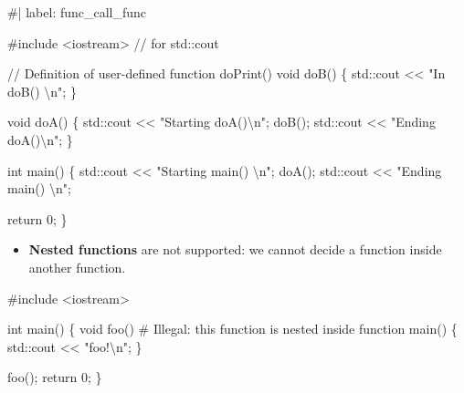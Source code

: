 \documentclass[
  letterpaper,
  DIV=11,
  numbers=noendperiod]{scrreprt}
\newenvironment{Shaded}{\begin{snugshade}}{\end{snugshade}}
\newcommand{\CommentTok}[1]{\textcolor[rgb]{0.37,0.37,0.37}{#1}}
\newcommand{\ControlFlowTok}[1]{\textcolor[rgb]{0.00,0.23,0.31}{#1}}
\newcommand{\DecValTok}[1]{\textcolor[rgb]{0.68,0.00,0.00}{#1}}
\newcommand{\ErrorTok}[1]{\textcolor[rgb]{0.68,0.00,0.00}{#1}}
\newcommand{\FunctionTok}[1]{\textcolor[rgb]{0.28,0.35,0.67}{#1}}
\newcommand{\NormalTok}[1]{\textcolor[rgb]{0.00,0.23,0.31}{#1}}
\newcommand{\SpecialCharTok}[1]{\textcolor[rgb]{0.37,0.37,0.37}{#1}}
\newcommand{\StringTok}[1]{\textcolor[rgb]{0.13,0.47,0.30}{#1}}
\providecommand{\tightlist}{%
  \setlength{\itemsep}{0pt}\setlength{\parskip}{0pt}}\usepackage{longtable,booktabs,array}
\begin{document}
\begin{Shaded}
\begin{Highlighting}[]
\CommentTok{\#| label: func\_call\_func}

\CommentTok{\#include \textless{}iostream\textgreater{}     // for std::cout}

\SpecialCharTok{/}\ErrorTok{/}\NormalTok{ Definition of user}\SpecialCharTok{{-}}\NormalTok{defined }\ControlFlowTok{function} \FunctionTok{doPrint}\NormalTok{()}
\NormalTok{void }\FunctionTok{doB}\NormalTok{()}
\NormalTok{\{}
\NormalTok{    std}\SpecialCharTok{::}\NormalTok{cout }\SpecialCharTok{\textless{}}\ErrorTok{\textless{}} \StringTok{"In doB() }\SpecialCharTok{\textbackslash{}n}\StringTok{"}\NormalTok{;}
\NormalTok{\}}

\NormalTok{void }\FunctionTok{doA}\NormalTok{()}
\NormalTok{\{}
\NormalTok{    std}\SpecialCharTok{::}\NormalTok{cout }\SpecialCharTok{\textless{}}\ErrorTok{\textless{}} \StringTok{"Starting doA()}\SpecialCharTok{\textbackslash{}n}\StringTok{"}\NormalTok{;}
    \FunctionTok{doB}\NormalTok{();}
\NormalTok{    std}\SpecialCharTok{::}\NormalTok{cout }\SpecialCharTok{\textless{}}\ErrorTok{\textless{}} \StringTok{"Ending doA()}\SpecialCharTok{\textbackslash{}n}\StringTok{"}\NormalTok{;}
\NormalTok{\}}

\NormalTok{int }\FunctionTok{main}\NormalTok{()}
\NormalTok{\{}
\NormalTok{    std}\SpecialCharTok{::}\NormalTok{cout }\SpecialCharTok{\textless{}}\ErrorTok{\textless{}} \StringTok{"Starting main() }\SpecialCharTok{\textbackslash{}n}\StringTok{"}\NormalTok{;}
    \FunctionTok{doA}\NormalTok{();}
\NormalTok{    std}\SpecialCharTok{::}\NormalTok{cout }\SpecialCharTok{\textless{}}\ErrorTok{\textless{}} \StringTok{"Ending main() }\SpecialCharTok{\textbackslash{}n}\StringTok{"}\NormalTok{;}

\NormalTok{    return }\DecValTok{0}\NormalTok{;}
\NormalTok{\}}
\end{Highlighting}
\end{Shaded}

\begin{itemize}
\tightlist
\item
  \textbf{Nested functions} are not supported: we cannot decide a
  function inside another function.
\end{itemize}

\begin{Shaded}
\begin{Highlighting}[]
\CommentTok{\#include \textless{}iostream\textgreater{}}

\NormalTok{int }\FunctionTok{main}\NormalTok{() }
\NormalTok{\{}
\NormalTok{  void }\FunctionTok{foo}\NormalTok{()  }\CommentTok{\# Illegal: this function is nested inside function main()}
\NormalTok{  \{}
\NormalTok{    std}\SpecialCharTok{::}\NormalTok{cout }\SpecialCharTok{\textless{}}\ErrorTok{\textless{}} \StringTok{"foo!}\SpecialCharTok{\textbackslash{}n}\StringTok{"}\NormalTok{;}
\NormalTok{  \}}
  
  \FunctionTok{foo}\NormalTok{();}
\NormalTok{  return }\DecValTok{0}\NormalTok{;}
\NormalTok{\}}
\end{Highlighting}
\end{Shaded}
\end{document}
